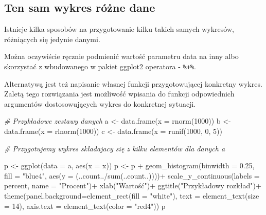 \documentclass[
]{book}
\newenvironment{Shaded}{\begin{snugshade}}{\end{snugshade}}
\newcommand{\AttributeTok}[1]{\textcolor[rgb]{0.77,0.63,0.00}{#1}}
\newcommand{\CommentTok}[1]{\textcolor[rgb]{0.56,0.35,0.01}{\textit{#1}}}
\newcommand{\DecValTok}[1]{\textcolor[rgb]{0.00,0.00,0.81}{#1}}
\newcommand{\FloatTok}[1]{\textcolor[rgb]{0.00,0.00,0.81}{#1}}
\newcommand{\FunctionTok}[1]{\textcolor[rgb]{0.00,0.00,0.00}{#1}}
\newcommand{\NormalTok}[1]{#1}
\newcommand{\OtherTok}[1]{\textcolor[rgb]{0.56,0.35,0.01}{#1}}
\newcommand{\SpecialCharTok}[1]{\textcolor[rgb]{0.00,0.00,0.00}{#1}}
\newcommand{\StringTok}[1]{\textcolor[rgb]{0.31,0.60,0.02}{#1}}
\begin{document}
\hypertarget{ten-sam-wykres-ruxf3ux17cne-dane}{%
\subsection{Ten sam wykres różne dane}\label{ten-sam-wykres-ruxf3ux17cne-dane}}

Istnieje kilka sposobów na przygotowanie kilku takich samych wykresów, różniących się jedynie danymi.

Można oczywiście ręcznie podmienić wartość parametru data na inny albo skorzystać z wbudowanego w pakiet ggplot2 operatora - \texttt{\%+\%}.

Alternatywą jest też napisanie własnej funkcji przygotowującej konkretny wykres. Zaletą tego rozwiązania jest możliwość wpisania do funkcji odpowiednich argumentów dostosowujących wykres do konkretnej sytuacji.

\begin{Shaded}
\begin{Highlighting}[]
\CommentTok{\# Przykładowe zestawy danych}
\NormalTok{a }\OtherTok{\textless{}{-}} \FunctionTok{data.frame}\NormalTok{(}\AttributeTok{x =} \FunctionTok{rnorm}\NormalTok{(}\DecValTok{1000}\NormalTok{))}
\NormalTok{b }\OtherTok{\textless{}{-}} \FunctionTok{data.frame}\NormalTok{(}\AttributeTok{x =} \FunctionTok{rlnorm}\NormalTok{(}\DecValTok{1000}\NormalTok{))}
\NormalTok{c }\OtherTok{\textless{}{-}} \FunctionTok{data.frame}\NormalTok{(}\AttributeTok{x =} \FunctionTok{runif}\NormalTok{(}\DecValTok{1000}\NormalTok{, }\DecValTok{0}\NormalTok{, }\DecValTok{5}\NormalTok{))}

\CommentTok{\# Przygotujemy wykres składajacy się z kilku elementów dla danych a}

\NormalTok{p }\OtherTok{\textless{}{-}} \FunctionTok{ggplot}\NormalTok{(}\AttributeTok{data =}\NormalTok{ a, }\FunctionTok{aes}\NormalTok{(}\AttributeTok{x =}\NormalTok{ x))}
\NormalTok{p }\OtherTok{\textless{}{-}}\NormalTok{ p }\SpecialCharTok{+} \FunctionTok{geom\_histogram}\NormalTok{(}\AttributeTok{binwidth =} \FloatTok{0.25}\NormalTok{, }\AttributeTok{fill =} \StringTok{"blue4"}\NormalTok{, }\FunctionTok{aes}\NormalTok{(}\AttributeTok{y =}\NormalTok{ (..count..}\SpecialCharTok{/}\FunctionTok{sum}\NormalTok{(..count..))))}\SpecialCharTok{+}
  \FunctionTok{scale\_y\_continuous}\NormalTok{(}\AttributeTok{labels =}\NormalTok{ percent, }\AttributeTok{name =} \StringTok{"Procent"}\NormalTok{)}\SpecialCharTok{+}
  \FunctionTok{xlab}\NormalTok{(}\StringTok{"Wartość"}\NormalTok{)}\SpecialCharTok{+}
  \FunctionTok{ggtitle}\NormalTok{(}\StringTok{"Przykładowy rozkład"}\NormalTok{)}\SpecialCharTok{+}
  \FunctionTok{theme}\NormalTok{(}\AttributeTok{panel.background=}\FunctionTok{element\_rect}\NormalTok{(}\AttributeTok{fill =} \StringTok{"white"}\NormalTok{), }\AttributeTok{text =} \FunctionTok{element\_text}\NormalTok{(}\AttributeTok{size =} \DecValTok{14}\NormalTok{), }
        \AttributeTok{axis.text =} \FunctionTok{element\_text}\NormalTok{(}\AttributeTok{color =} \StringTok{"red4"}\NormalTok{))}
\NormalTok{p}
\end{Highlighting}
\end{Shaded}
\end{document}
